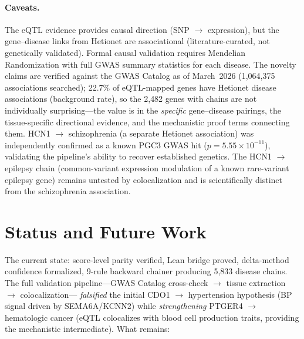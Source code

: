 \documentclass[11pt,openany]{report}
\begin{document}
\paragraph{Caveats.}
The eQTL evidence provides causal direction (SNP $\to$ expression),
but the gene--disease links from Hetionet are associational
(literature-curated, not genetically validated).  Formal causal
validation requires Mendelian Randomization with full GWAS summary
statistics for each disease.  The novelty claims are verified
against the GWAS Catalog as of March~2026 (1{,}064{,}375
associations searched); 22.7\% of eQTL-mapped genes have Hetionet
disease associations (background rate), so the 2{,}482 genes with
chains are not individually surprising---the value is in the
\emph{specific} gene--disease pairings, the tissue-specific
directional evidence, and the mechanistic proof terms connecting
them.  HCN1 $\to$ schizophrenia (a separate Hetionet association)
was independently confirmed as a known PGC3 GWAS hit
($p = 5.55 \times 10^{-11}$), validating the pipeline's ability
to recover established genetics.  The HCN1 $\to$ epilepsy chain
(common-variant expression modulation of a known rare-variant
epilepsy gene) remains untested by colocalization and is
scientifically distinct from the schizophrenia association.


\section{Status and Future Work}

The current state: score-level parity verified, Lean bridge proved,
delta-method confidence formalized, 9-rule backward chainer
producing 5{,}833 disease chains.  The full validation pipeline---GWAS
Catalog cross-check $\to$ tissue extraction $\to$ colocalization---
\emph{falsified} the initial CDO1 $\to$ hypertension hypothesis
(BP signal driven by SEMA6A/KCNN2) while \emph{strengthening}
PTGER4 $\to$ hematologic cancer (eQTL colocalizes with blood cell
production traits, providing the mechanistic intermediate).
What remains:
\end{document}
